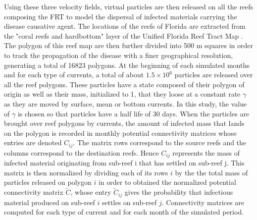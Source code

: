 \documentclass[utf8]{frontiersSCNS}
\begin{document}
Using these three velocity fields, virtual particles are then released on all the reefs composing the FRT to model the dispersal of infected materials carrying the disease causative agent. The locations of the reefs of Florida are extracted from the "coral reefs and hardbottom" layer of the Unified Florida Reef Tract Map \citep{fwc2017unified}. The polygon of this reef map are then further divided into 500 m squares in order to track the propagation of the disease with a finer geographical resolution, generating a total of 16823 polygons. %
At the beginning of each simulated months and for each type of currents, a total of about $1.5 \times 10^6$ particles are released over all the reef polygons. These particles have a state composed of their polygon of origin as well as their mass, initialized to 1, that they loose at a constant rate $\gamma$ as they are moved by surface, mean or bottom currents. In this study, the value of $\gamma$ is chosen so that particles have a half life of 30 days. When the particles are brought over reef polygons by currents, the amount of infected mass that lands on the polygon is recorded in monthly potential connectivity matrices whose entries are denoted $C_{ij}$. The matrix rows correspond to the source reefs and the columns correspond to the destination reefs. Hence $C_{ij}$ represents the mass of infected material originating from sub-reef i that has settled on sub-reef j. This matrix is then normalized by dividing each of its rows $i$ by the the total mass of particles released on polygon $i$ in order to obtained the normalized potential connectivity matrix $\tilde{C}$, whose entry $\tilde{C}_{ij}$ gives the probability that infectious material produced on sub-reef $i$ settles on sub-reef $j$. Connectivity matrices are computed for each type of current and for each month of the simulated period.
\end{document}
